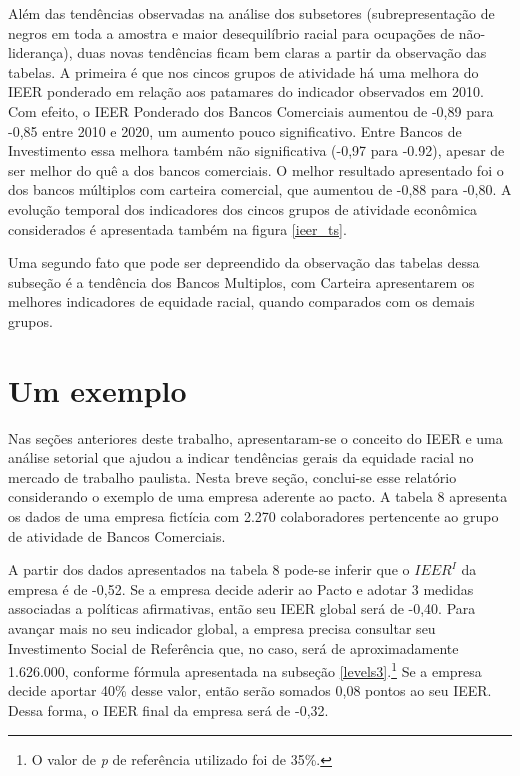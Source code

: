 \documentclass[12pt]{article}
\begin{document}






\par Além das tendências observadas na análise dos subsetores (subrepresentação de negros em toda a amostra e maior desequilíbrio racial para ocupações de não-liderança), duas novas tendências ficam bem claras a partir da observação das tabelas. A primeira é que nos cincos grupos de atividade há uma melhora do IEER ponderado em relação aos patamares do indicador observados em 2010. Com efeito, o IEER Ponderado dos Bancos Comerciais aumentou de -0,89 para -0,85 entre 2010 e 2020, um aumento pouco significativo. Entre Bancos de Investimento essa melhora também não significativa (-0,97 para -0.92), apesar de ser melhor do quê a dos bancos comerciais. O melhor resultado apresentado foi o dos bancos múltiplos com carteira comercial, que aumentou de -0,88 para -0,80.  A evolução temporal dos indicadores dos cincos grupos de atividade econômica considerados é apresentada também na figura \ref{ieer_ts}.

 \label{ieer_ts}

\par Uma segundo fato que pode ser depreendido da observação das tabelas dessa subseção é a tendência dos Bancos Multiplos, com Carteira apresentarem os melhores indicadores de equidade racial, quando comparados com os demais grupos.

\clearpage

\section{Um exemplo} \label{als_study}

\par Nas seções anteriores deste trabalho, apresentaram-se o conceito do IEER e uma análise setorial que ajudou a indicar tendências gerais da equidade racial no mercado de trabalho paulista. Nesta breve seção, conclui-se esse relatório considerando o exemplo de uma empresa aderente ao pacto. A tabela 8 apresenta os dados de uma empresa fictícia com 2.270 colaboradores pertencente ao grupo de atividade de Bancos Comerciais.

 \label{example_company}

\par A partir dos dados apresentados na tabela 8 pode-se inferir que o $IEER^{I}$ da empresa é de -0,52. Se a empresa decide aderir ao Pacto e adotar 3 medidas associadas a políticas afirmativas, então seu IEER global será de -0,40. Para avançar mais no seu indicador global, a empresa precisa consultar seu Investimento Social de Referência que, no caso, será de aproximadamente 1.626.000, conforme fórmula apresentada na subseção \ref{levels3}.\footnote{O valor de \textit{p} de referência utilizado foi de 35\%.} Se a empresa decide aportar 40\% desse valor, então serão somados 0,08 pontos ao seu IEER. Dessa forma, o IEER final da empresa será de -0,32. 
\end{document}
